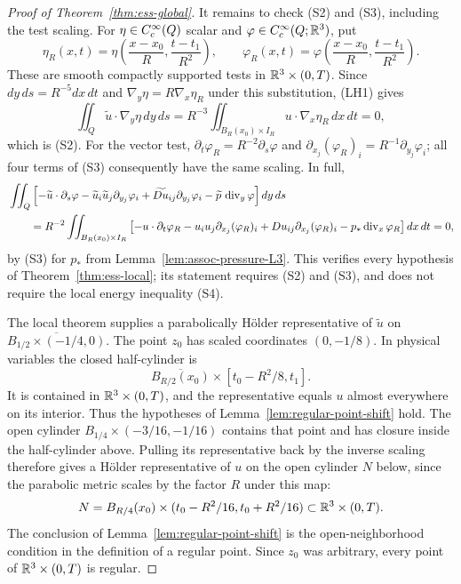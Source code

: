 \documentclass[11pt,letterpaper]{article}
\numberwithin{equation}{section}
\theoremstyle{plain}
\theoremstyle{definition}
\theoremstyle{remark}
\begin{document}
\begin{proof}[Proof of Theorem~\ref{thm:ess-global}]
It remains to check (S2) and (S3), including the test scaling. For
$\eta\in C_c^\infty(Q)$ scalar and $\varphi\in C_c^\infty(Q;\mathbb{R}^3)$, put
\[
 \eta_R(x,t)=\eta\left(\frac{x-x_0}{R},\frac{t-t_1}{R^2}\right),\qquad
 \varphi_R(x,t)=\varphi\left(\frac{x-x_0}{R},\frac{t-t_1}{R^2}\right).
\]
These are smooth compactly supported tests in
$\mathbb{R}^3\times(0,T)$. Since $dy\,ds=R^{-5}dx\,dt$ and
$\nabla_y\eta=R\nabla_x\eta_R$ under this substitution, (LH1) gives
\[
 \iint_Q\widetilde u\cdot\nabla_y\eta\,dy\,ds
 =R^{-3}\iint_{B_R(x_0)\times I_R}u\cdot\nabla_x\eta_R\,dx\,dt=0,
\]
which is (S2). For the vector test,
$\partial_t\varphi_R=R^{-2}\partial_s\varphi$ and
$\partial_{x_j}(\varphi_R)_i=R^{-1}\partial_{y_j}\varphi_i$; all four terms
of (S3) consequently have the same scaling. In full,
\begin{align*}
 &\iint_Q\left[-\widetilde u\cdot\partial_s\varphi
 -\widetilde u_i\widetilde u_j\partial_{y_j}\varphi_i
 +\widetilde{Du}_{ij}\partial_{y_j}\varphi_i
 -\widetilde p\,\operatorname{div}_y\varphi\right]dy\,ds\\
 &\qquad=R^{-2}\iint_{B_R(x_0)\times I_R}
 \left[-u\cdot\partial_t\varphi_R-u_i u_j\partial_{x_j}(\varphi_R)_i
 +Du_{ij}\partial_{x_j}(\varphi_R)_i-p_*\operatorname{div}_x\varphi_R\right]dx\,dt=0,
\end{align*}
by (S3) for $p_*$ from Lemma~\ref{lem:assoc-pressure-L3}. This verifies every
hypothesis of Theorem~\ref{thm:ess-local}; its statement requires (S2) and
(S3), and does not require the local energy inequality (S4).

The local theorem supplies a parabolically H\"older representative of
$\widetilde u$ on
$\overline{B_{1/2}\times(-1/4,0)}$. The point $z_0$ has scaled coordinates
$(0,-1/8)$. In physical variables the closed half-cylinder is
\[
 \overline{B_{R/2}(x_0)}\times[t_0-R^2/8,t_1].
\]
It is contained in $\mathbb{R}^3\times(0,T)$, and the representative equals $u$
almost everywhere on its interior. Thus the hypotheses of
Lemma~\ref{lem:regular-point-shift} hold. The open cylinder
$B_{1/4}\times(-3/16,-1/16)$ contains that point and has closure inside the
half-cylinder above. Pulling its representative back by the inverse scaling
therefore gives a H\"older representative of $u$ on the open cylinder $N$
below, since the parabolic metric scales by the factor $R$ under this map:
\[
 N=B_{R/4}(x_0)\times(t_0-R^2/16,t_0+R^2/16)
 \subset\mathbb{R}^3\times(0,T).
\]
The conclusion of Lemma~\ref{lem:regular-point-shift} is the
open-neighborhood condition in the definition of a regular point.
Since $z_0$ was arbitrary, every point of $\mathbb{R}^3\times(0,T)$ is regular.
\end{proof}
\end{document}
